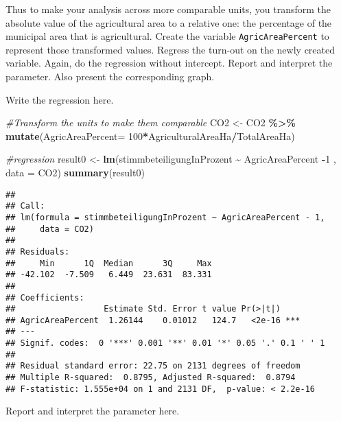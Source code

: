 \documentclass[
]{book}
\newenvironment{Shaded}{\begin{snugshade}}{\end{snugshade}}
\newcommand{\AttributeTok}[1]{\textcolor[rgb]{0.13,0.29,0.53}{#1}}
\newcommand{\CommentTok}[1]{\textcolor[rgb]{0.56,0.35,0.01}{\textit{#1}}}
\newcommand{\DecValTok}[1]{\textcolor[rgb]{0.00,0.00,0.81}{#1}}
\newcommand{\FunctionTok}[1]{\textcolor[rgb]{0.13,0.29,0.53}{\textbf{#1}}}
\newcommand{\NormalTok}[1]{#1}
\newcommand{\OtherTok}[1]{\textcolor[rgb]{0.56,0.35,0.01}{#1}}
\newcommand{\SpecialCharTok}[1]{\textcolor[rgb]{0.81,0.36,0.00}{\textbf{#1}}}
\begin{document}
Thus to make your analysis across more comparable units, you transform the absolute value of the agricultural area to a relative one: the percentage of the municipal area that is agricultural. Create the variable \texttt{AgricAreaPercent} to represent those transformed values. Regress the turn-out on the newly created variable. Again, do the regression without intercept. Report and interpret the parameter. Also present the corresponding graph.

Write the regression here.

\begin{Shaded}
\begin{Highlighting}[]
\CommentTok{\#Transform the units to make them comparable }
\NormalTok{CO2 }\OtherTok{\textless{}{-}}\NormalTok{ CO2 }\SpecialCharTok{\%\textgreater{}\%}
  \FunctionTok{mutate}\NormalTok{(}\AttributeTok{AgricAreaPercent=} \DecValTok{100}\SpecialCharTok{*}\NormalTok{AgriculturalAreaHa}\SpecialCharTok{/}\NormalTok{TotalAreaHa)}

\CommentTok{\#regression}
\NormalTok{result0 }\OtherTok{\textless{}{-}} \FunctionTok{lm}\NormalTok{(stimmbeteiligungInProzent }\SpecialCharTok{\textasciitilde{}}\NormalTok{ AgricAreaPercent }\SpecialCharTok{{-}}\DecValTok{1}\NormalTok{ , }\AttributeTok{data =}\NormalTok{ CO2)}
\FunctionTok{summary}\NormalTok{(result0)}
\end{Highlighting}
\end{Shaded}

\begin{verbatim}
## 
## Call:
## lm(formula = stimmbeteiligungInProzent ~ AgricAreaPercent - 1, 
##     data = CO2)
## 
## Residuals:
##     Min      1Q  Median      3Q     Max 
## -42.102  -7.509   6.449  23.631  83.331 
## 
## Coefficients:
##                  Estimate Std. Error t value Pr(>|t|)    
## AgricAreaPercent  1.26144    0.01012   124.7   <2e-16 ***
## ---
## Signif. codes:  0 '***' 0.001 '**' 0.01 '*' 0.05 '.' 0.1 ' ' 1
## 
## Residual standard error: 22.75 on 2131 degrees of freedom
## Multiple R-squared:  0.8795, Adjusted R-squared:  0.8794 
## F-statistic: 1.555e+04 on 1 and 2131 DF,  p-value: < 2.2e-16
\end{verbatim}

Report and interpret the parameter here.
\end{document}
